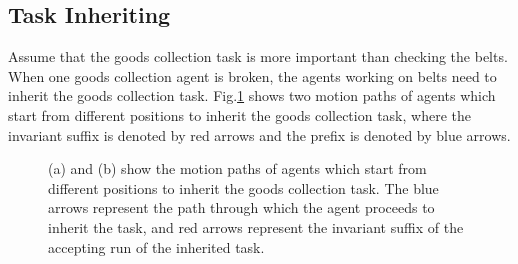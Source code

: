 \documentclass[journal]{IEEEtran}
\begin{document}
\subsection{Task Inheriting}
Assume that the goods collection task is more important than checking the belts. When one goods collection agent is broken, the agents working on belts need to inherit the goods collection task. Fig.\ref{third} shows two motion paths of agents which start from different positions to inherit the goods collection task, where the invariant suffix is denoted by red arrows and the prefix is denoted by blue arrows.
\begin{figure}
\centering
{}
\hspace{0.3in}
\caption{(a) and (b) show the motion paths of agents which start from different positions to inherit the goods collection task. The blue arrows represent the path through which the agent proceeds to inherit the task, and red arrows represent the invariant suffix of the accepting run of the inherited task. }
\label{third}
\end{figure}

\end{document}
